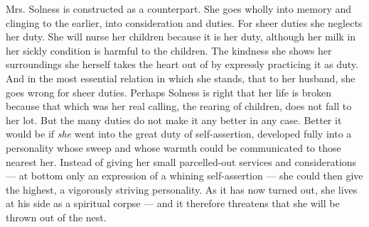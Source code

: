 \documentclass[12pt,a4paper,openany]{book}
\begin{document}
Mrs. Solness is constructed as a counterpart. She goes
wholly into memory and clinging to the earlier, into
consideration and duties. For sheer duties she neglects her duty.
She will nurse her children because it is her duty, although
her milk in her sickly condition is harmful to
the children. The kindness she shows her surroundings she
herself takes the heart out of by expressly practicing it
as duty. And in the most essential relation in which she
stands, that to her husband, she goes wrong for sheer duties.
Perhaps Solness is right that her life is broken because
that which was her real calling, the rearing of children, does not
fall to her lot. But the many duties do not make it any better in any
case. Better it would be if \emph{she} went into
the great duty of self-assertion, developed fully into
a personality whose sweep and whose warmth could be communicated
to those nearest her. Instead of giving her small
parcelled-out services and considerations --- at bottom only an expression of
a whining self-assertion --- she could then give the highest,
a vigorously striving personality. As it has now turned out,
she lives at his side as a spiritual corpse --- and it
therefore threatens that she will be thrown out of the nest.
\end{document}
